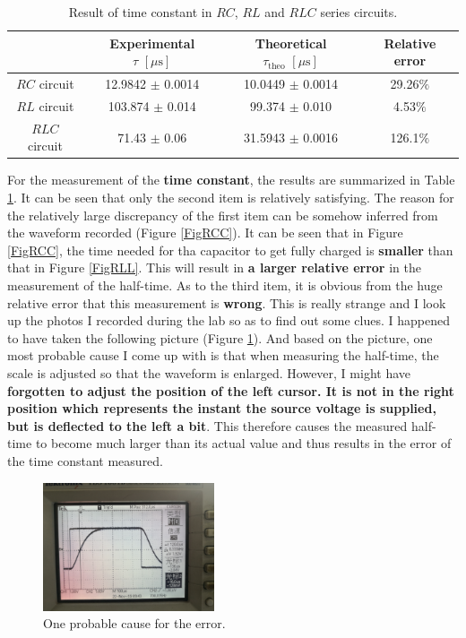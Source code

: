 \documentclass{article}
\begin{document}
\begin{table}[H]\centering
    \begin{tabular}{cccc}
        \toprule
                      & Experimental $\tau\,\,[\mu\text{s}]$ & Theoretical $\tau_{\text{theo}}\,\,[\mu\text{s}]$ & Relative error \\
        \midrule
        $RC$ circuit  & 12.9842 $\pm$ 0.0014                 & 10.0449 $\pm$ 0.0014                              & 29.26$\%$      \\
        $RL$ circuit  & 103.874 $\pm$ 0.014                  & 99.374 $\pm$ 0.010                                & 4.53$\%$       \\
        $RLC$ circuit & 71.43 $\pm$ 0.06                     & 31.5943 $\pm$ 0.0016                              & 126.1$\%$      \\
        \bottomrule
    \end{tabular}
    \caption{Result of time constant in $RC$, $RL$ and $RLC$ series circuits.}\label{TableResult}
\end{table}

For the measurement of the \textbf{time constant}, the results are summarized in Table \ref{TableResult}.
It can be seen that only the second item is relatively satisfying. The reason for the relatively large discrepancy of the first item can be somehow inferred from the waveform recorded (Figure \ref{FigRCC}). It can be seen that in Figure \ref{FigRCC}, the time needed for tha capacitor to get fully charged is \textbf{smaller} than that in Figure \ref{FigRLL}. This will result in \textbf{a larger relative error} in the measurement of the half-time. As to the third item, it is obvious from the huge relative error that this measurement is \textbf{wrong}. This is really strange and I look up the photos I recorded during the lab so as to find out some clues. I happened to have taken the following picture (Figure \ref{fig:error}). And based on the picture, one most probable cause I come up with is that when measuring the half-time, the scale is adjusted so that the waveform is enlarged. However, I might have \textbf{forgotten to adjust the position of the left cursor. It is not in the right position which represents the instant the source voltage is supplied, but is deflected to the left a bit}. This therefore causes the measured half-time to become much larger than its actual value and thus results in the error of the time constant measured.

\begin{figure}[H] \centering
    \includegraphics[width=0.45\textwidth]{6.jpg}
    \caption{One probable cause for the error.}
    \label{fig:error}
\end{figure}
\end{document}
